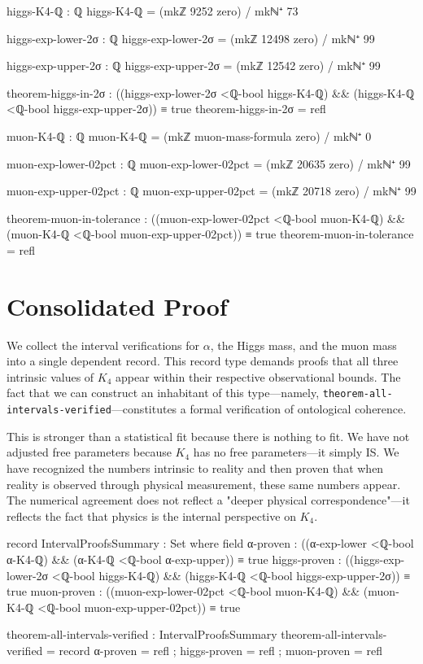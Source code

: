 \documentclass[11pt,a4paper]{book}
\begin{document}
\begin{code}
higgs-K4-ℚ : ℚ
higgs-K4-ℚ = (mkℤ 9252 zero) / mkℕ⁺ 73

higgs-exp-lower-2σ : ℚ
higgs-exp-lower-2σ = (mkℤ 12498 zero) / mkℕ⁺ 99

higgs-exp-upper-2σ : ℚ
higgs-exp-upper-2σ = (mkℤ 12542 zero) / mkℕ⁺ 99

theorem-higgs-in-2σ : ((higgs-exp-lower-2σ <ℚ-bool higgs-K4-ℚ) && (higgs-K4-ℚ <ℚ-bool higgs-exp-upper-2σ)) ≡ true
theorem-higgs-in-2σ = refl
\end{code}

\begin{code}
muon-K4-ℚ : ℚ
muon-K4-ℚ = (mkℤ muon-mass-formula zero) / mkℕ⁺ 0

muon-exp-lower-02pct : ℚ
muon-exp-lower-02pct = (mkℤ 20635 zero) / mkℕ⁺ 99

muon-exp-upper-02pct : ℚ
muon-exp-upper-02pct = (mkℤ 20718 zero) / mkℕ⁺ 99

theorem-muon-in-tolerance : ((muon-exp-lower-02pct <ℚ-bool muon-K4-ℚ) && (muon-K4-ℚ <ℚ-bool muon-exp-upper-02pct)) ≡ true
theorem-muon-in-tolerance = refl
\end{code}

\section{Consolidated Proof}

We collect the interval verifications for $\alpha$, the Higgs mass, and the muon mass into 
a single dependent record. This record type demands proofs that all three intrinsic values of $K_4$ appear within their respective observational bounds. The fact that we can construct an inhabitant of this type---namely, \texttt{theorem-all-intervals-verified}---constitutes a formal verification of ontological coherence.

This is stronger than a statistical fit because there is nothing to fit. We have not adjusted free parameters because $K_4$ has no free parameters—it simply IS. We have recognized the numbers intrinsic to reality and then proven that when reality is observed through physical measurement, these same numbers appear. The numerical agreement does not reflect a "deeper physical correspondence"—it reflects the fact that physics is the internal perspective on $K_4$.

\begin{code}
record IntervalProofsSummary : Set where
  field
    α-proven : ((α-exp-lower <ℚ-bool α-K4-ℚ) && (α-K4-ℚ <ℚ-bool α-exp-upper)) ≡ true
    higgs-proven : ((higgs-exp-lower-2σ <ℚ-bool higgs-K4-ℚ) && (higgs-K4-ℚ <ℚ-bool higgs-exp-upper-2σ)) ≡ true
    muon-proven : ((muon-exp-lower-02pct <ℚ-bool muon-K4-ℚ) && (muon-K4-ℚ <ℚ-bool muon-exp-upper-02pct)) ≡ true

theorem-all-intervals-verified : IntervalProofsSummary
theorem-all-intervals-verified = record
  { α-proven = refl
  ; higgs-proven = refl
  ; muon-proven = refl
  }
\end{code}
\end{document}

